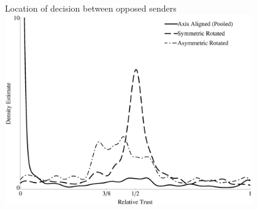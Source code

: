 \documentclass{beamer}
\begin{document}
\begin{frame}{Location of decision between opposed senders}
	\centering \includegraphics[width=0.8\textwidth]{./i/OpposedSenderTrust_KernelM.eps}
\end{frame}
\end{document}
